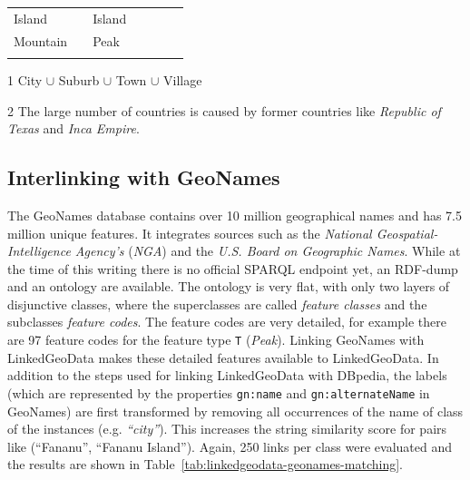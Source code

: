 \begin{table}[ht]
\begin{threeparttable}
\begin{tabulary}{0.502\textwidth}{LRLRRRR}
Island			&	&Island				&	&	&	&\\
Mountain		&	&Peak				&	&	&	&\\
\fi
\bottomrule
\end{tabulary}
\begin{tablenotes}
\item [1] City $\cup$ Suburb $\cup$ Town $\cup$ Village
\item [2] The large number of countries is caused by former countries like \emph{Republic of Texas} and \emph{Inca Empire}.
\end{tablenotes}
\end{threeparttable}
\end{table}

%

\subsection{Interlinking with GeoNames}
The GeoNames database contains over 10 million geographical names and has 7.5 million unique features.
It integrates sources such as the \emph{National Geospatial-Intelligence Agency's} (\emph{NGA}) and the \emph{U.S. Board on Geographic Names}.
While at the time of this writing there is no official SPARQL endpoint yet, an RDF-dump and an ontology are available.
The ontology is very flat, with only two layers of disjunctive classes, where the superclasses are called \emph{feature classes} and the subclasses \emph{feature codes}.
The feature codes are very detailed, for example there are 97 feature codes for the feature type \nolinkurl{T} (\emph{Peak}).
Linking GeoNames with LinkedGeoData makes these detailed features available to
LinkedGeoData. In addition to the steps used for linking LinkedGeoData with DBpedia, the labels (which are represented by the properties \nolinkurl{gn:name} and \nolinkurl{gn:alternateName} in GeoNames) are first transformed by removing all occurrences of the name of class of the instances (e.g. \emph{``city''}). This increases the string similarity score for pairs like (``Fananu'', ``Fananu Island'').
Again, 250 links per class were evaluated and the results are shown in
Table~\ref{tab:linkedgeodata-geonames-matching}.

